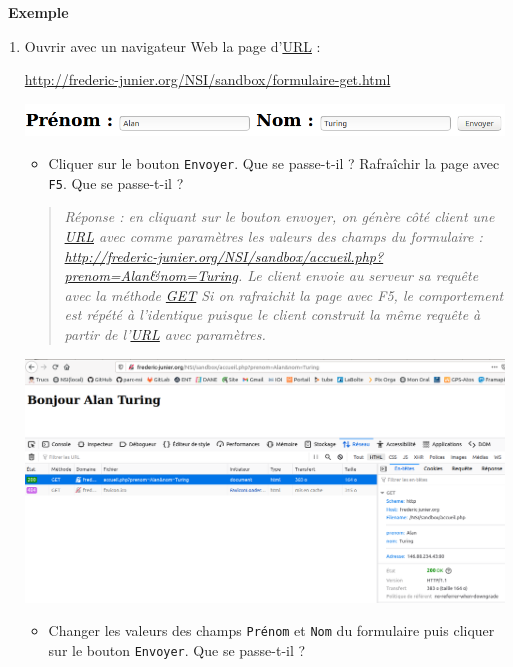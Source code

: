 \documentclass[
  11pt,
]{article}
\newcommand{\passthrough}[1]{#1}
\providecommand{\tightlist}{%
  \setlength{\itemsep}{0pt}\setlength{\parskip}{0pt}}
\newcounter{def}
\newcounter{exple}
\newenvironment{exemple}[1]
{\par \medskip   \addtocounter{exple}{1} \noindent  
\begin{bclogo}[arrondi =0.1,   noborder = true, logo=\bclampe, marge=4]{~\textbf{Exemple} \textbf{\theexple} {\itshape #1} }  \par}
{
\end{bclogo}
 \par \bigskip }
\begin{document}
\begin{exemple}{}

\begin{enumerate}
\def\labelenumi{\arabic{enumi}.}
\item
  Ouvrir avec un navigateur Web la page
  d'\href{https://developer.mozilla.org/fr/docs/Glossaire/URL}{URL} :

  \url{http://frederic-junier.org/NSI/sandbox/formulaire-get.html}

  \includegraphics{images/formulaire1.png}\\

  \begin{itemize}
  \tightlist
  \item
    Cliquer sur le bouton \passthrough{\lstinline!Envoyer!}. Que se
    passe-t-il ? Rafraîchir la page avec \passthrough{\lstinline!F5!}.
    Que se passe-t-il ?
  \end{itemize}

  \begin{quote}
  \emph{Réponse : en cliquant sur le bouton envoyer, on génère côté
  client une \url{URL} avec comme paramètres les valeurs des champs du
  formulaire :
  \url{http://frederic-junier.org/NSI/sandbox/accueil.php?prenom=Alan\&nom=Turing}.
  Le client envoie au serveur sa requête avec la méthode \url{GET} Si on
  rafraichit la page avec F5, le comportement est répété à l'identique
  puisque le client construit la même requête à partir de l'\url{URL}
  avec paramètres.}
  \end{quote}

  \includegraphics{images/requete_formulaire.png}\\

  \begin{itemize}
  \tightlist
  \item
    Changer les valeurs des champs \passthrough{\lstinline!Prénom!} et
    \passthrough{\lstinline!Nom!} du formulaire puis cliquer sur le
    bouton \passthrough{\lstinline!Envoyer!}. Que se passe-t-il ?
  \end{itemize}


\end{enumerate}
\end{exemple}
\end{document}
